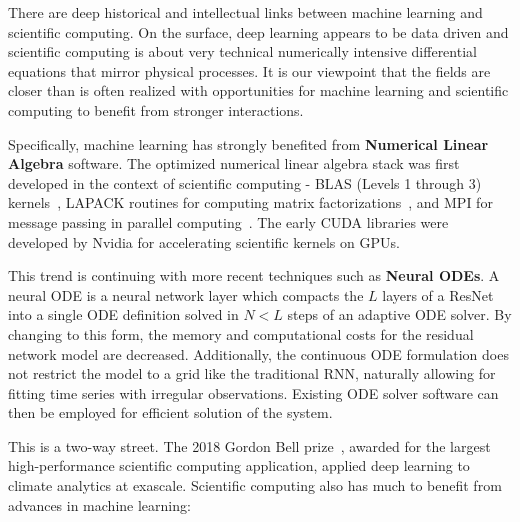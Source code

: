 \documentclass{juliacon}
\begin{document}
    There are deep historical and intellectual links between machine learning and scientific computing.  On the surface, deep learning appears to be data driven and scientific computing is about very technical numerically intensive differential equations that mirror physical processes. It is our viewpoint that the fields are closer than is often realized with opportunities for machine learning and scientific computing to benefit from stronger interactions. 
    
    Specifically, machine learning has strongly benefited from {\bf Numerical Linear Algebra} software. The optimized numerical linear algebra stack was first developed in the context of scientific computing - BLAS (Levels 1 through 3) kernels~\cite{blas}, LAPACK routines for computing matrix factorizations~\cite{lapack}, and MPI for message passing in parallel computing~\cite{mpi}. The early CUDA libraries were developed by Nvidia for accelerating scientific kernels on GPUs.

    This trend is continuing with more recent techniques such as {\bf Neural ODEs}. A neural ODE \cite{chen2018neural} is a neural network layer which compacts the $L$ layers of a ResNet into a single ODE definition solved in $N<L$ steps of an adaptive ODE solver. By changing to this form, the memory and computational costs for the residual network model are decreased.  Additionally, the continuous ODE formulation does not restrict the model to a grid like the traditional RNN, naturally allowing for fitting time series with irregular observations. Existing ODE solver software can then be employed for efficient solution of the system.
    
    This is a two-way street. The 2018 Gordon Bell prize~\cite{gordon-bell-2018-a}, awarded for the largest high-performance scientific computing application, applied deep learning to climate analytics at exascale. Scientific computing also has much to benefit from advances in machine learning:
    
\end{document}
